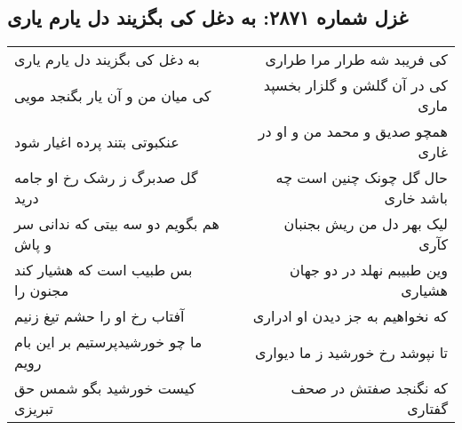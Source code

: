 \begin{center}
\section*{غزل شماره ۲۸۷۱: به دغل کی بگزیند دل یارم یاری}
\label{sec:2871}
\begin{longtable}{l p{0.5cm} r}
به دغل کی بگزیند دل یارم یاری
&&
کی فریبد شه طرار مرا طراری
\\
کی میان من و آن یار بگنجد مویی
&&
کی در آن گلشن و گلزار بخسپد ماری
\\
عنکبوتی بتند پرده اغیار شود
&&
همچو صدیق و محمد من و او در غاری
\\
گل صدبرگ ز رشک رخ او جامه درید
&&
حال گل چونک چنین است چه باشد خاری
\\
هم بگویم دو سه بیتی که ندانی سر و پاش
&&
لیک بهر دل من ریش بجنبان کآری
\\
بس طبیب است که هشیار کند مجنون را
&&
وین طبیبم نهلد در دو جهان هشیاری
\\
آفتاب رخ او را حشم تیغ زنیم
&&
که نخواهیم به جز دیدن او ادراری
\\
ما چو خورشیدپرستیم بر این بام رویم
&&
تا نپوشد رخ خورشید ز ما دیواری
\\
کیست خورشید بگو شمس حق تبریزی
&&
که نگنجد صفتش در صحف گفتاری
\\
\end{longtable}
\end{center}
